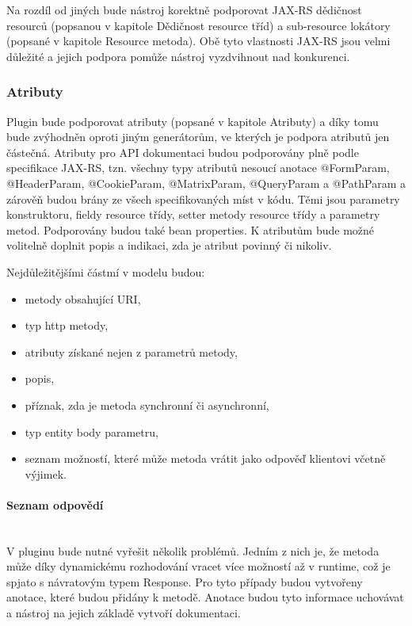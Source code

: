 \documentclass[11pt,twoside,a4paper]{book}
\begin{document}
\begin{itemize}
Na rozdíl od jiných bude nástroj korektně podporovat JAX-RS dědičnost resourců (popsanou
v kapitole Dědičnost resource tříd) a sub-resource lokátory (popsané v kapitole Resource
metoda). Obě tyto vlastnosti JAX-RS jsou velmi důležité a jejich podpora pomůže nástroj
vyzdvihnout nad konkurenci.

\subsubsection{Atributy}

Plugin bude podporovat atributy (popsané v kapitole Atributy) a díky tomu bude zvýhodněn
oproti jiným generátorům, ve kterých je podpora atributů jen částečná. Atributy pro API
dokumentaci budou podporovány plně podle specifikace JAX-RS, tzn. všechny typy atributů
nesoucí anotace @FormParam, @HeaderParam, @CookieParam, @MatrixParam,
@QueryParam a @PathParam a zárověň budou brány ze všech specifikovaných míst v
kódu. Těmi jsou parametry konstruktoru, fieldy resource třídy, setter metody resource třídy a
parametry metod. Podporovány budou také bean properties. K atributům bude možné
volitelně doplnit popis a indikaci, zda je atribut povinný či nikoliv.

Nejdůležitějšími částmí v modelu budou:
\begin{itemize}
  \item metody obsahující URI,
  \item typ http metody,
  \item atributy získané nejen z parametrů metody,
  \item popis,
  \item příznak, zda je metoda synchronní či asynchronní,
  \item typ entity body parametru,
  \item seznam možností, které může metoda vrátit jako odpověď klientovi včetně
  výjimek.
\end{itemize}

\paragraph{Seznam odpovědí}
\mbox{}\\

V pluginu bude nutné vyřešit několik problémů. Jedním z nich je, že metoda může díky
dynamickému rozhodování vracet více možností až v runtime, což je spjato s návratovým
typem Response. Pro tyto případy budou vytvořeny anotace, které budou přidány k metodě.
Anotace budou tyto informace uchovávat a nástroj na jejich základě vytvoří dokumentaci.


\end{itemize}
\end{document}
